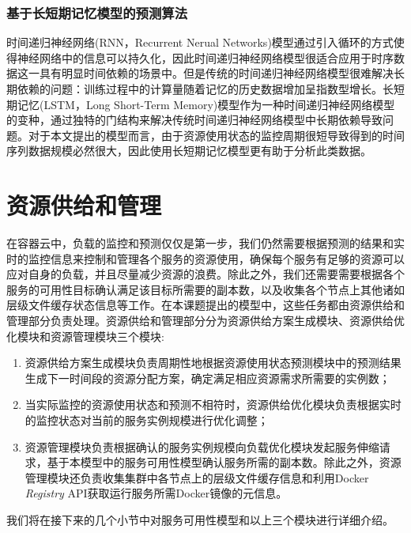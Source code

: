 \subsubsection{基于长短期记忆模型的预测算法}
时间递归神经网络(RNN，Recurrent Nerual Networks)模型通过引入循环的方式使得神经网络中的信息可以持久化\cite{graves2012supervised}，因此时间递归神经网络模型很适合应用于时序数据这一具有明显时间依赖的场景中。但是传统的时间递归神经网络模型很难解决长期依赖的问题：训练过程中的计算量随着记忆的历史数据增加呈指数型增长\cite{bengio1994learning}。长短期记忆(LSTM，Long Short-Term Memory)模型作为一种时间递归神经网络模型的变种，通过独特的门结构来解决传统时间递归神经网络模型中长期依赖导致问题。对于本文提出的模型而言，由于资源使用状态的监控周期很短导致得到的时间序列数据规模必然很大，因此使用长短期记忆模型更有助于分析此类数据。

\section{资源供给和管理}
在容器云中，负载的监控和预测仅仅是第一步，我们仍然需要根据预测的结果和实时的监控信息来控制和管理各个服务的资源使用，确保每个服务有足够的资源可以应对自身的负载，并且尽量减少资源的浪费。除此之外，我们还需要需要根据各个服务的可用性目标确认满足该目标所需要的副本数，以及收集各个节点上其他诸如层级文件缓存状态信息等工作。在本课题提出的模型中，这些任务都由资源供给和管理部分负责处理。资源供给和管理部分分为资源供给方案生成模块、资源供给优化模块和资源管理模块三个模块:
\begin{enumerate}
\item 资源供给方案生成模块负责周期性地根据资源使用状态预测模块中的预测结果生成下一时间段的资源分配方案，确定满足相应资源需求所需要的实例数；
\item 当实际监控的资源使用状态和预测不相符时，资源供给优化模块负责根据实时的监控状态对当前的服务实例规模进行优化调整；
\item 资源管理模块负责根据确认的服务实例规模向负载优化模块发起服务伸缩请求，基于本模型中的服务可用性模型确认服务所需的副本数。除此之外，资源管理模块还负责收集集群中各节点上的层级文件缓存信息和利用Docker \emph{Registry} API获取运行服务所需Docker镜像的元信息。
\end{enumerate}
我们将在接下来的几个小节中对服务可用性模型和以上三个模块进行详细介绍。


